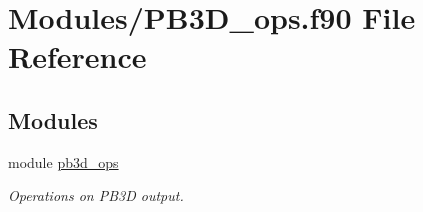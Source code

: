\hypertarget{PB3D__ops_8f90}{}\section{Modules/\+P\+B3\+D\+\_\+ops.f90 File Reference}
\label{PB3D__ops_8f90}
\subsection*{Modules}
\begin{DoxyCompactItemize}
\item 
module \hyperlink{namespacepb3d__ops}{pb3d\+\_\+ops}
\begin{DoxyCompactList}\small\item\em Operations on P\+B3D output. \end{DoxyCompactList}\end{DoxyCompactItemize}
